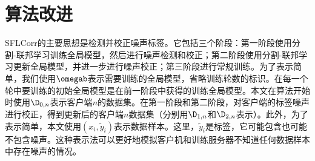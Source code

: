 \section{算法改进}
SFLCorr的主要思想是检测并校正噪声标签。它包括三个阶段：第一阶段使用分割-联邦学习训练全局模型，然后进行噪声检测和校正；第二阶段使用分割-联邦学习更新全局模型，并进一步进行噪声校正；第三阶段进行常规训练。为了表示简单，我们使用$\omegab$表示需要训练的全局模型，省略训练轮数的标识。在每一个轮中要训练的初始全局模型是在前一阶段中获得的训练全局模型。本文在算法开始时使用$\D_{0,n}$表示客户端$n$的数据集。在第一阶段和第二阶段，对客户端的标签噪声进行校正，得到更新后的客户端$n$数据集（分别用$\D_{1,n}$和$\D_{2,n}$表示）。此外，为了表示简单，本文使用$(x_i, \tilde{y}_i)$表示数据样本。这里，$\tilde{y}_i$是标签，它可能包含也可能不包含噪声。这种表示法可以更好地模拟客户机和训练服务器不知道任何数据样本中存在噪声的情况。

